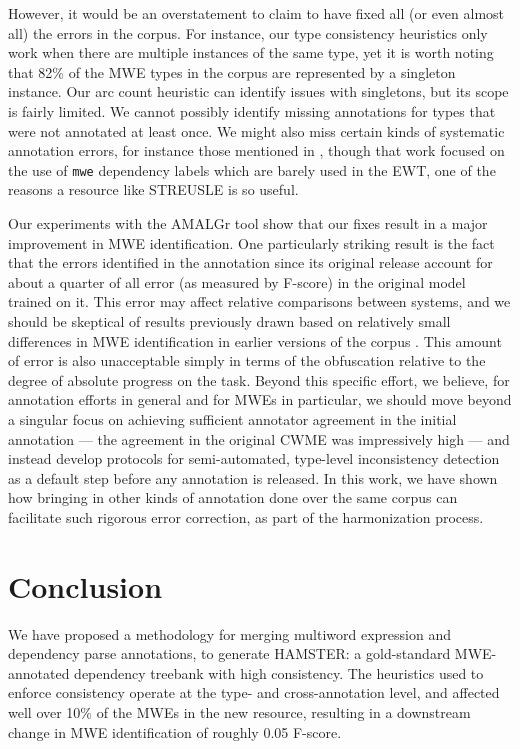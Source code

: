 \documentclass[output=paper
,modfonts
,nonflat]{langsci/langscibook}
\newcommand{\mwetype}[1]{\texttt{#1}\xspace}
\begin{document}
However, it would be an overstatement to claim to have fixed all (or even almost all) the errors in the corpus. For instance, our type consistency heuristics only work when there are multiple instances of the same type, yet it is worth noting that 82\% of the MWE types in the corpus are represented by a singleton instance. Our arc count heuristic can identify issues with singletons, but its scope is fairly limited. We cannot possibly identify missing annotations for types that were not annotated at least once. We might also miss certain kinds of systematic annotation errors, for instance those mentioned in \citet{de2015studying}, though that work focused on the use of \mwetype{mwe} dependency labels which are barely used in the EWT, one of the reasons a resource like STREUSLE is so useful.

Our experiments with the AMALGr tool show that our fixes result in a major improvement in MWE identification. One particularly striking result is the fact that the errors identified in the annotation since its original release account for about a quarter of all error (as measured by F-score) in the original model trained on it. This error may affect relative comparisons between systems, and we should be skeptical of results previously drawn based on relatively small differences in MWE identification in earlier versions of the corpus . This amount of error is also unacceptable simply in terms of the obfuscation relative to the degree of absolute progress on the task. Beyond this specific effort, we believe, for annotation efforts in general and for MWEs in particular, we should move beyond a singular focus on achieving sufficient annotator agreement in the initial annotation --- the agreement in the original CWME was impressively high --- and instead develop protocols for semi-automated, type-level inconsistency detection as a default step before any annotation is released. In this work, we have shown how bringing in other kinds of annotation done over the same corpus can facilitate such rigorous error correction, as part of the harmonization process.


\section{Conclusion}

We have proposed a methodology for merging multiword expression and dependency parse annotations, to generate HAMSTER: a gold-standard MWE-annotated dependency treebank with high consistency. The heuristics used to enforce consistency operate at the type- and cross-annotation level, and affected well over 10\% of the MWEs in the new resource, resulting in a downstream change in MWE identification of roughly 0.05 F-score.

%
%

{\sloppy
\printbibliography[heading=subbibliography,notkeyword=this]
}
\end{document}
